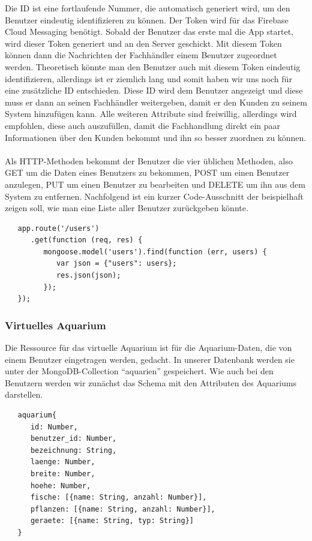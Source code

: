 Die ID ist eine fortlaufende Nummer, die automatisch generiert wird, um den Benutzer eindeutig identifizieren zu können. Der Token wird für das Firebase Cloud Messaging benötigt. Sobald der Benutzer das erste mal die App startet, wird dieser Token generiert und an den Server geschickt. Mit diesem Token können dann die Nachrichten der Fachhändler einem Benutzer zugeordnet werden. Theoretisch könnte man den Benutzer auch mit diesem Token eindeutig identifizieren, allerdings ist er ziemlich lang und somit haben wir uns noch für eine zusätzliche ID entschieden. Diese ID wird dem Benutzer angezeigt und diese muss er dann an seinen Fachhändler weitergeben, damit er den Kunden zu seinem System hinzufügen kann. Alle weiteren Attribute sind freiwillig, allerdings wird empfohlen, diese auch auszufüllen, damit die Fachhandlung direkt ein paar Informationen über den Kunden bekommt und ihn so besser zuordnen zu können.
\\ \\
Als HTTP-Methoden bekommt der Benutzer die vier üblichen Methoden, also GET um die Daten eines Benutzers zu bekommen, POST um einen Benutzer anzulegen, PUT um einen Benutzer zu bearbeiten und DELETE um ihn aus dem System zu entfernen. Nachfolgend ist ein kurzer Code-Ausschnitt der beispielhaft zeigen soll, wie man eine Liste aller Benutzer zurückgeben könnte.

\begin{lstlisting}
   app.route('/users')
      .get(function (req, res) {
         mongoose.model('users').find(function (err, users) {
            var json = {"users": users};
            res.json(json);
         });
   });
\end{lstlisting}

\subsubsection{Virtuelles Aquarium}

Die Ressource für das virtuelle Aquarium ist für die Aquarium-Daten, die von einem Benutzer eingetragen werden, gedacht. In unserer Datenbank werden sie unter der MongoDB-Collection ``aquarien'' gespeichert. Wie auch bei den Benutzern werden wir zunächst das Schema mit den Attributen des Aquariums darstellen.

\begin{lstlisting}
   aquarium{
      id: Number,
      benutzer_id: Number,
      bezeichnung: String,
      laenge: Number,
      breite: Number,
      hoehe: Number,
      fische: [{name: String, anzahl: Number}],
      pflanzen: [{name: String, anzahl: Number}],
      geraete: [{name: String, typ: String}]
   }
\end{lstlisting}

